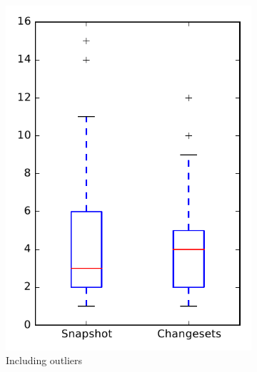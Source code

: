 
\begin{figure}
    \centering
    \begin{subfigure}{.4\textwidth}
        \centering
        \includegraphics[height=0.4\textheight]{figures/dit/rq1_zookeeper}
        \caption{Including outliers}\label{fig:dit:rq1:zookeeper_outlier}
    \end{subfigure}%
    \begin{subfigure}{.4\textwidth}
        \centering

\end{subfigure}
\end{figure}
